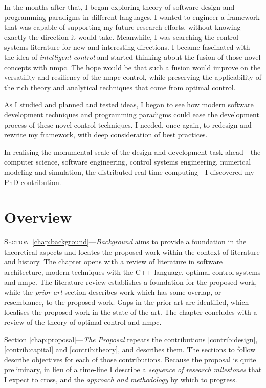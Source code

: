 In the months after that, I began exploring theory of software design and
programming paradigms in different languages. I wanted to engineer a framework
that was capable of supporting my future research efforts, without knowing
exactly the direction it would take. Meanwhile, I was searching the control
systems literature for new and interesting directions. I became fascinated with
the idea of \emph{intelligent control} and started thinking about the fusion of
those novel concepts with \ac{nmpc}. The hope would be that such a fusion would
improve on the versatility and resiliency of the \ac{nmpc} control, while
preserving the applicability of the rich theory and analytical techniques that
come from optimal control.

As I studied and planned and tested ideas, I began to see how modern software
development techniques and programming paradigms could ease the development
process of these novel control techniques. I needed, once again, to redesign and
rewrite my framework, with deep consideration of best practices.

In realising the monumental scale of the design and development task ahead—the
computer science, software engineering, control systems engineering, numerical
modeling and simulation, the distributed real-time computing—I discovered my PhD
contribution.


\section{Overview}


\textsc{Section}~\ref{chap:background}—\emph{Background} aims to provide a
foundation in the theoretical aspects and locates the proposed work within the
context of literature and history. The chapter opens with a review of literature
in software architecture, modern techniques with the C++ language, optimal
control systems and \ac{nmpc}. The literature review establishes a foundation
for the proposed work, while the \emph{prior art} section describes work which
has some overlap, or resemblance, to the proposed work. Gaps in the prior art
are identified, which localises the proposed work in the state of the art. The
chapter concludes with a review of the theory of optimal control and
\ac{nmpc}.

Section \ref{chap:proposal}—\emph{The Proposal} repeats the contributions
\ref{contrib:design}, \ref{contrib:capital} and \ref{contrib:theory}, and
describes them. The sections to follow describe objectives for each of those
contributions. Because the proposal is quite preliminary, in lieu of a time-line
I describe a \emph{sequence of research milestones} that I expect to cross, and
the \emph{approach and methodology} by which to progress.

